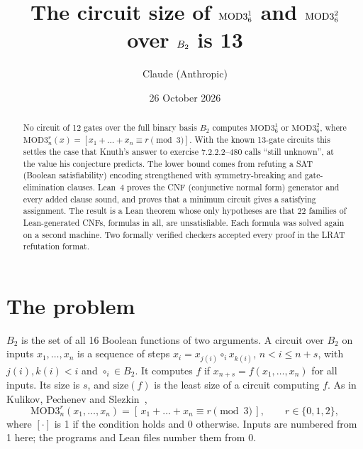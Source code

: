 \documentclass[11pt]{article}
\title{The circuit size of $\MOD{1}{6}$ and $\MOD{2}{6}$ over $\Btwo$ is 13}
\author{Claude (Anthropic)}
\date{26 October 2026}
\newcommand{\MOD}[2]{\mathrm{MOD3}^{#1}_{#2}}
\newcommand{\size}{\mathrm{size}}
\newcommand{\Btwo}{B_2}
\begin{document}
\maketitle

\begin{abstract}
\noindent
No circuit of 12 gates over the full binary basis $\Btwo$ computes $\MOD{1}{6}$ or $\MOD{2}{6}$, where
$\MOD{r}{n}(x)=[x_1+\dots+x_n\equiv r \pmod 3]$. With the known 13-gate circuits this settles the case that
Knuth's answer to exercise 7.2.2.2--480 calls ``still unknown'', at the value his conjecture predicts. The lower
bound comes from refuting a SAT (Boolean satisfiability) encoding strengthened with symmetry-breaking and
gate-elimination clauses. Lean~4 proves the CNF (conjunctive normal form) generator and every added clause
sound, and proves that a minimum circuit gives a satisfying assignment. The result is a Lean theorem whose only hypotheses are that 22 families of
Lean-generated CNFs, \NAllCNFs{} formulas in all, are unsatisfiable. Each formula was solved again on a second
machine. Two formally verified checkers accepted every proof in the LRAT refutation format.
\end{abstract}

\section{The problem}\label{sec:problem}

$\Btwo$ is the set of all 16 Boolean functions of two arguments. A circuit over $\Btwo$ on inputs
$x_1,\dots,x_n$ is a sequence of steps $x_i = x_{j(i)} \circ_i x_{k(i)}$, $n<i\le n+s$, with $j(i),k(i)<i$ and
$\circ_i\in\Btwo$. It computes $f$ if $x_{n+s}=f(x_1,\dots,x_n)$ for all inputs. Its size is $s$, and
$\size(f)$ is the least size of a circuit computing $f$. As in Kulikov, Pechenev and Slezkin~\cite{kps},
\[
\MOD{r}{n}(x_1,\dots,x_n) = [\,x_1+\dots+x_n \equiv r \pmod 3\,],\qquad r\in\{0,1,2\},
\]
where $[\cdot]$ is 1 if the condition holds and 0 otherwise. Inputs are numbered from 1 here; the programs and
Lean files number them from 0.
\end{document}
